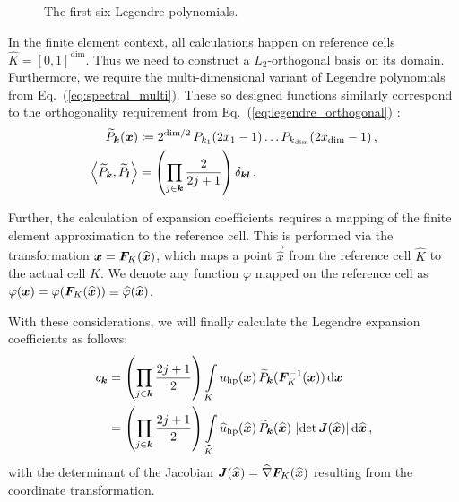 \begin{figure}
\centering

\caption{The first six Legendre polynomials.}
\label{fig:legendre}
\end{figure}

In the finite element context, all calculations happen on reference cells $\widehat{K} = [0,1]^\text{dim}$. Thus we need to construct a $L_2$-orthogonal basis on its domain. Furthermore, we require the multi-dimensional variant of Legendre polynomials from Eq.~(\ref{eq:spectral_multi}). These so designed functions similarly correspond to the orthogonality requirement from Eq.~(\ref{eq:legendre_orthogonal}) \textcite{dealiilegendre}:
\begin{align}
\widetilde{P}_\tuple{k}(\vec{x}) &\coloneqq 2^{\text{dim}/2} \, P_{k_1}(2x_1 - 1) \dots P_{k_\text{dim}}(2x_\text{dim} - 1) \,\text{,} \\
\left\langle \widetilde{P}_\tuple{k}, \widetilde{P}_\tuple{l} \right\rangle &= \left(\prod\limits_{j \in \tuple{k}} \frac{2}{2j+1}\right) \delta_{\tuple{k} \tuple{l}} \,\text{.}
\end{align}

Further, the calculation of expansion coefficients requires a mapping of the finite element approximation to the reference cell. This is performed via the transformation $\vec{x} = \mat{F}_K(\vec{\widehat{x}})$, which maps a point $\vec{\widehat{x}}$ from the reference cell $\widehat{K}$ to the actual cell $K$. We denote any function $\varphi$ mapped on the reference cell as $\varphi(\vec{x}) = \varphi(\mat{F}_K(\vec{\widehat{x}})) \equiv \widehat{\varphi}(\vec{\widehat{x}})$. \textcite{dealiimapping}

With these considerations, we will finally calculate the Legendre expansion coefficients as follows:
\begin{align}
c_\tuple{k} &=
\left(\prod\limits_{j \in \tuple{k}} \frac{2j+1}{2}\right) \int\limits_{K} u_\text{hp}(\vec{x}) \, \widetilde{P}_\tuple{k}(\mat{F}_K^{-1}(\vec{x})) \differential{\vec{x}} \\
&= \left(\prod\limits_{j \in \tuple{k}} \frac{2j+1}{2}\right) \int\limits_{\widehat{K}} \widehat{u}_\text{hp}(\vec{\widehat{x}}) \, \widetilde{P}_\tuple{k}(\vec{\widehat{x}}) \, \left|\det \mat{J}(\vec{\widehat{x}})\right| \differential{\vec{\widehat{x}}} \,\text{,}
\end{align}
with the determinant of the Jacobian $\mat{J}(\vec{\widehat{x}}) = \widehat{\nabla} \mat{F}_K (\vec{\widehat{x}})$ resulting from the coordinate transformation. \textcite{dealiilegendre}

